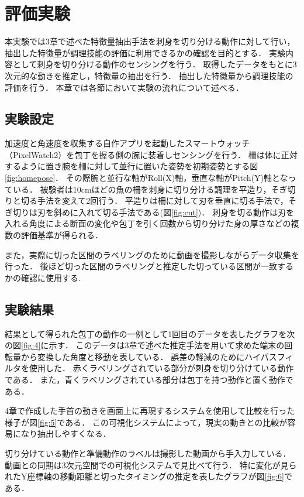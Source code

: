 \chapter{評価実験}
本実験では3章で述べた特徴量抽出手法を刺身を切り分ける動作に対して行い，抽出した特徴量が調理技能の評価に利用できるかの確認を目的とする．
実験内容として刺身を切り分ける動作のセンシングを行う．
取得したデータをもとに3次元的な動きを推定し，特徴量の抽出を行う．
抽出した特徴量から調理技能の評価を行う．
本章では各節において実験の流れについて述べる．
\section{実験設定}
加速度と角速度を収集する自作アプリを起動したスマートウォッチ（PixelWatch2）を包丁を握る側の腕に装着しセンシングを行う．
柵は体に正対するように置き腕を柵に対して並行に置いた姿勢を初期姿勢とする図\ref{fig:homepose}．
その際腕と並行な軸がRoll(X)軸，垂直な軸がPitch(Y)軸となっている．
被験者は10cmほどの魚の柵を刺身に切り分ける調理を平造り，そぎ切りと切る手法を変えて2回行う．
平造りは柵に対して刃を垂直に切る手法で，そぎ切りは刃を斜めに入れて切る手法である(図\ref{fig:cut})．
刺身を切る動作は刃を入れる角度による断面の変化や包丁を引く回数から切り分けた身の厚さなどの複数の評価基準が得られる．

また，実際に切った区間のラベリングのために動画を撮影しながらデータ収集を行った．
後ほど切った区間のラベリングと推定した切っている区間が一致するかの確認に使用する.
\section{実験結果}
結果として得られた包丁の動作の一例として1回目のデータを表したグラフを次の図\ref{fig:4}に示す．
このデータは3章で述べた推定手法を用いて求めた端末の回転量から変換した角度と移動を表している．
誤差の軽減のためにハイパスフィルタを使用した．
赤くラベリングされている部分が刺身を切り分けている動作である．
また，青くラベリングされている部分は包丁を持つ動作と置く動作である．

4章で作成した手首の動きを画面上に再現するシステムを使用して比較を行った様子が図\ref{fig:5}である．
この可視化システムによって，現実の動きとの比較が容易になり抽出しやすくなる．

切り分けている動作と準備動作のラベルは撮影した動画から手入力している．
動画との同期は3次元空間での可視化システムで見比べて行う．
特に変化が見られたY座標軸の移動距離と切ったタイミングの推定を表したグラフが図\ref{fig:6}である．

